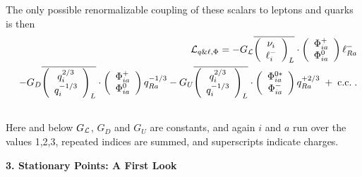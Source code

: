 \documentclass[12pt]{article}
\begin{document}
The only possible renormalizable coupling of these scalars to leptons and quarks is then
\begin{eqnarray}
&&{\cal L}_{q\&\ell,\Phi}=-G_{\cal L}\overline{\left(\begin{array}{c}\nu_i\\ \ell^-_i\end{array}\right)_L}\cdot \left(\begin{array}{c}\Phi^+_{ia}\\\Phi^0_{ia}\end{array}\right)\ell^-_{Ra}\nonumber\\&&-G_D\overline{\left(\begin{array}{c}q^{2/3}_i\\ q^{-1/3}_i\end{array}\right)_L}\cdot \left(\begin{array}{c}\Phi^+_{ia}\\\Phi^0_{ia}\end{array}\right)q^{-1/3}_{Ra}
-G_U\overline{\left(\begin{array}{c}q^{2/3}_i\\ q^{-1/3}_i\end{array}\right)_L}\cdot \left(\begin{array}{c}\Phi^{0*}_{ia}\\\Phi^-_{ia}\end{array}\right)q^{+2/3}_{Ra}
\;+\;{\rm c.c.} \;.\nonumber\\&&{}
\end{eqnarray}
Here and below $G_{\cal L}$, $G_D$ and $G_U$ are  constants, and again $i$ and $a$ run over the values 1,2,3,  repeated indices are summed, and superscripts indicate charges. 



\begin{center}
{\bf 3. Stationary Points: A First Look}
\end{center}
\end{document}
